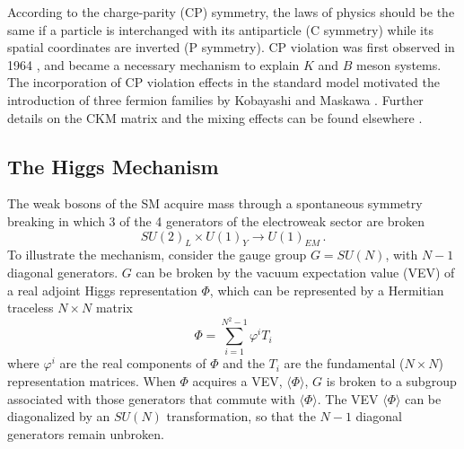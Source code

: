 According to the charge-parity (CP) symmetry, the laws of physics should be the same if a particle is interchanged with its antiparticle (C symmetry) while its spatial coordinates are inverted (P symmetry). CP violation was first observed in 1964 \cite{Christenson:1964fg}, and became a necessary mechanism to explain $K$ and $B$ meson systems. The incorporation of CP violation effects in the standard model motivated the introduction of three fermion families by Kobayashi and Maskawa \cite{Kobayashi:1973fv}. Further details on the CKM matrix and the mixing effects can be found elsewhere \cite{Langacker:2010zza}. 

\subsection{The Higgs Mechanism}
The weak bosons of the SM acquire mass through a spontaneous symmetry breaking in which 3 of the 4 generators of the electroweak sector are broken
\begin{equation*}
SU(2)_L\times U(1)_Y \rightarrow U(1)_{EM}\,.
\end{equation*}
To illustrate the mechanism, consider the gauge group $G=SU(N)$, with $N-1$ diagonal generators. $G$ can be broken by the vacuum expectation value (VEV) of a real adjoint Higgs representation $\Phi$, which can be represented by a Hermitian traceless $N\times N$ matrix
\begin{equation}
\Phi=\sum_{i=1}^{N^2-1}\varphi^i T_i
\end{equation}
where $\varphi^i$ are the real components of $\Phi$ and the $T_i$ are the fundamental ($N\times N$) representation matrices. When $\Phi$ acquires a VEV,  $\langle\Phi\rangle$, $G$ is broken to a subgroup associated with those generators that commute with $\langle\Phi\rangle$. The VEV $\langle\Phi\rangle$ can be diagonalized by an $SU(N)$ transformation, so that the $N-1$ diagonal generators remain unbroken.

